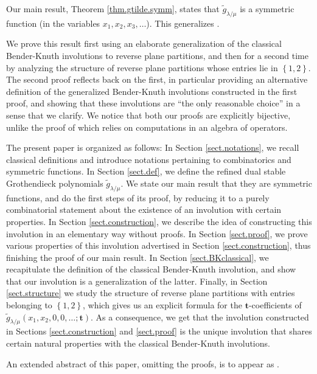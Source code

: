\documentclass[12pt]{article}
\theoremstyle{plain}
\theoremstyle{definition}
\def\g{{\widetilde{g}}}
\def\t{{\mathbf{t}}}
\def\lm{{\lambda/\mu}}
\begin{document}
Our main result, Theorem \ref{thm.gtilde.symm}, states that
$\widetilde{g}_{\lambda/\mu}$ is a symmetric function (in the
variables $x_{1},x_{2},x_{3},\ldots$). This
generalizes \cite[Theorem 9.1]{LamPyl}.

We prove this result first using an elaborate generalization
of the classical Bender-Knuth involutions to reverse plane partitions,
and then for a second time by analyzing the structure of reverse plane
partitions whose entries lie in $\left\{1, 2\right\}$. The second
proof reflects back on the first, in particular providing an
alternative definition of the generalized Bender-Knuth involutions
constructed in the first proof, and showing that these involutions
are ``the only reasonable choice'' in a sense that we clarify.
We notice that both our proofs are explicitly bijective, unlike
the proof of \cite[Theorem 9.1]{LamPyl} which relies on computations
in an algebra of operators.

The present paper is organized as follows: In Section \ref{sect.notations}, we
recall classical definitions and introduce notations pertaining to
combinatorics and symmetric functions. In Section \ref{sect.def}, we define
the refined dual stable Grothendieck polynomials $\widetilde{g}_{\lambda/\mu}$. We state
our main result that they are symmetric functions, and do the first steps of
its proof, by reducing it to a purely combinatorial statement about the
existence of an involution with certain properties. In Section \ref{sect.construction}, we describe the idea of constructing this involution in an elementary way without proofs. In Section
\ref{sect.proof}, we prove various properties of this involution advertised in Section \ref{sect.construction}, thus finishing the proof of our main result. In Section \ref{sect.BKclassical}, we
recapitulate the definition of the classical Bender-Knuth involution, and
show that our involution is a generalization of the latter.
Finally, in Section \ref{sect.structure} we study the structure of
reverse plane partitions with entries belonging to $\left\{1, 2\right\}$,
which gives us an explicit formula for the
$\mathbf{t}$-coefficients of $\g_\lm(x_1,x_2,0,0,\dots;\t)$.
As a consequence, we get that the involution constructed in
Sections \ref{sect.construction} and \ref{sect.proof} is the unique
involution that shares certain natural properties with the classical
Bender-Knuth involutions.

An extended abstract of this paper, omitting the proofs, is to appear
as \cite{GaGrLi16}.
\end{document}
